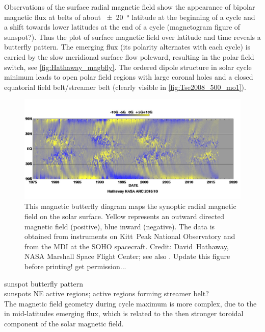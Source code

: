 Observations of the surface radial magnetic field show the appearance of bipolar magnetic flux at belts of about \SI{+-20}{\degree} latitude at the beginning of a cycle and a shift towards lower latitudes at the end of a cycle (magnetogram figure of sunspot?). Thus the plot of surface magnetic field over latitude and time reveals a butterfly pattern. The emerging flux (its polarity alternates with each cycle) is carried by the slow meridional surface flow poleward, resulting in the polar field switch, see \autoref{fig:Hathaway_magbfly}. The ordered dipole structure in solar cycle minimum leads to open polar field regions with large coronal holes and a closed equatorial field belt/streamer belt (clearly visible in \autoref{fig:Tse2008_500_mo1}).\\
\begin{figure}[htb]
	\centering
	\includegraphics[width=\textwidth]{images/Hathaway_magbfly_201610.jpg}
	\caption{This magnetic butterfly diagram maps the synoptic radial magnetic field on the solar surface. Yellow represents an outward directed magnetic field (positive), blue inward (negative). The data is obtained from instruments on Kitt~Peak National Observatory and from the MDI at the SOHO spacecraft. Credit: David~Hathaway, NASA Marshall Space Flight Center; see also \citet[Fig.~17]{Hathaway2015}. Update this figure before printing! get permission...}
	\label{fig:Hathaway_magbfly}
\end{figure}

sunspot butterfly pattern \citep{Maunder1904}\\

sunspots NE active regions; active regions forming streamer belt?\\

The magnetic field geometry during cycle maximum is more complex, due to the in mid-latitudes emerging flux, which is related to the then stronger toroidal component of the solar magnetic field.\\

